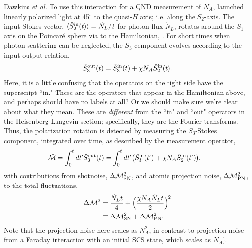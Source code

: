 \documentclass[preprint,aps,pra,onecolumn]{revtex4-1} %
\newcommand{\change}[1]{{\color{RoyalBlue} #1}}
\newcommand{\comment}[1]{{\color{Maroon} #1}}
\begin{document}
\change{Dawkins {\em et al.} To use this interaction for a QND measurement of $N_A$, launched linearly polarized light at 45$^\circ$ to the quasi-$H$ axis; i.e. along the $S_2$-axis.  The input Stokes vector, $\langle \hat{S}_2^{\rm in}(t)\rangle  = \dot{N}_L/2$ for photon flux $\dot{N}_L$, rotates around the $S_1$-axis on the Poincar\'{e} sphere via to the Hamiltonian, \erf{Eq::MixedHamiltonian}.  For short times when photon scattering can be neglected, the $S_3$-component evolves according to the input-output relation,
\change{
\begin{equation}
\hat{S}_3^{\rm out}(t) = \hat{S}_3^{\rm in}(t) + \chi N_A \hat{S}_2^{\rm in}(t).
\end{equation}
}
\comment{Here, it is a little confusing that the operators on the right side have the superscript ``in."  These are the operators that appear in the Hamiltonian above, and perhaps should have no labels at all?  Or we should make sure we're clear about what they mean.  These are \emph{different} from the ``in" and ``out" operators in the Heisenberg-Langevin section; specifically, they are the Fourier transforms.  } Thus, the polarization rotation is detected by measuring the $S_3$-Stokes component, integrated over time, as described by the measurement operator,
	\begin{align}
		\hat{\mathcal{M}} &= \int_0^t dt' \hat{S}_3^{\rm out}(t) = \int_0^t dt' \big(\hat{S}_3^{\rm in}(t') + \chi N_A \hat{S}_2^{\rm in}(t') \big),
	\end{align}
with contributions from shotnoise, $\Delta \mathcal{M}_{\rm SN}^2$, and atomic projection noise, $\Delta \mathcal{M}_{\rm PN}^2$, to the total fluctuations,
	\begin{align}
		\Delta \mathcal{M}^2 &= \frac{\dot{N}_L t}{4} +  \Big( \frac{\chi N_A \dot{N}_L t}{2} \Big)^2 \label{Eq::MeasurementVariance}\\
			&\equiv \Delta \mathcal{M}_{\rm SN}^2 + \Delta \mathcal{M}_{\rm PN}^2.
	\end{align}
\comment{Note that the projection noise here scales as $N_A^2$, in contrast to projection noise from a Faraday interaction with an initial SCS state, which scales as $N_A$). }

}
\end{document}
